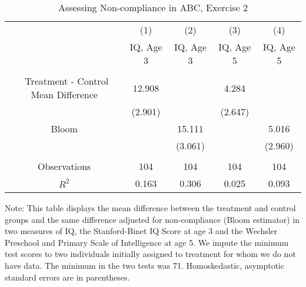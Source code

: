 \begin{table}[H] 
\begin{threeparttable}
\caption{Assessing Non-compliance in ABC, Exercise 2}
\label{table:nc2}
\centering 
\begin{tabular}{ccccc} \hline \hline
 & (1) & (2) & (3) & (4) \\
 & IQ, Age 3 & IQ, Age 3  & IQ, Age 5 & IQ, Age 5 \\ \hline
 &  &  & & \\\
Treatment - Control Mean Difference & 12.908 &  & 4.284 &  \\
 & (2.901) &  & (2.647) &  \\
Bloom &  & 15.111 &  & 5.016 \\
 &  & (3.061) &  & (2.960) \\ \\ \hline
Observations & 104 & 104 & 104 & 104 \\
 $R^2$ & 0.163 & 0.306 & 0.025 & 0.093 \\ \hline \hline
 \end{tabular}
\begin{tablenotes}
\footnotesize
\item Note: This table displays the mean difference between the treatment and control groups and the same difference adjusted for non-compliance (Bloom estimator) in two measures of IQ, the Stanford-Binet IQ Score at age 3 and the Wechsler Preschool and Primary Scale of Intelligence at age 5. We impute the minimum test scores to two individuals initially assigned to treatment for whom we do not have data. The minimum in the two tests was 71. Homoskedastic, asymptotic standard errors are in parentheses.
\end{tablenotes}
\end{threeparttable}
\end{table}

